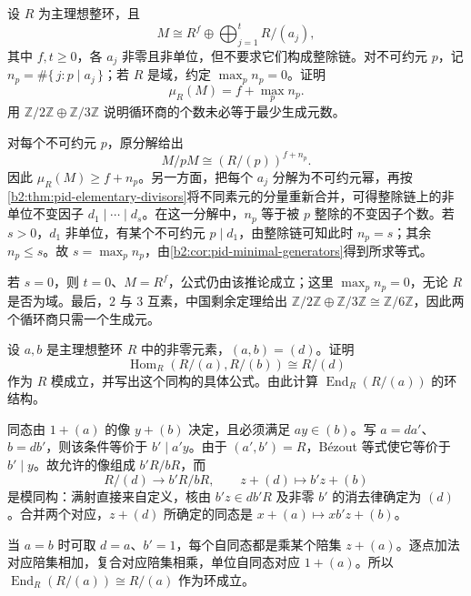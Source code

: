 \begin{exercise}\label{b2:ex:04-minimal-generators}
	设 \(R\) 为主理想整环，且
	\[
		M\cong R^f\oplus\bigoplus_{j=1}^t R/(a_j),
	\]
	其中 \(f,t\ge0\)，各 \(a_j\) 非零且非单位，但不要求它们构成整除链。对不可约元 \(p\)，记 \(n_p=\#\{\,j:p\mid a_j\,\}\)；若 \(R\) 是域，约定 \(\max_p n_p=0\)。证明
	\[
		\mu_R(M)=f+\max_p n_p.
	\]
	用 \(\mathbb Z/2\mathbb Z\oplus\mathbb Z/3\mathbb Z\) 说明循环商的个数未必等于最少生成元数。
\end{exercise}
\begin{solution}
	对每个不可约元 \(p\)，原分解给出
	\[
		M/pM\cong(R/(p))^{f+n_p}.
	\]
	因此 \(\mu_R(M)\ge f+n_p\)。另一方面，把每个 \(a_j\) 分解为不可约元幂，再按\cref{b2:thm:pid-elementary-divisors}将不同素元的分量重新合并，可得整除链上的非单位不变因子 \(d_1\mid\cdots\mid d_s\)。在这一分解中，\(n_p\) 等于被 \(p\) 整除的不变因子个数。若 \(s>0\)，\(d_1\) 非单位，有某个不可约元 \(p\mid d_1\)，由整除链可知此时 \(n_p=s\)；其余 \(n_p\le s\)。故 \(s=\max_p n_p\)，由\cref{b2:cor:pid-minimal-generators}得到所求等式。

	若 \(s=0\)，则 \(t=0\)、\(M=R^f\)，公式仍由该推论成立；这里 \(\max_p n_p=0\)，无论 \(R\) 是否为域。最后，\(2\) 与 \(3\) 互素，中国剩余定理给出 \(\mathbb Z/2\mathbb Z\oplus\mathbb Z/3\mathbb Z\cong\mathbb Z/6\mathbb Z\)，因此两个循环商只需一个生成元。
\end{solution}

\begin{exercise}\label{b2:ex:04-hom-cyclic-pid}
	设 \(a,b\) 是主理想整环 \(R\) 中的非零元素，\((a,b)=(d)\)。证明
	\[
		\operatorname{Hom}_R(R/(a),R/(b))\cong R/(d)
	\]
	作为 \(R\) 模成立，并写出这个同构的具体公式。由此计算 \(\operatorname{End}_R(R/(a))\) 的环结构。
\end{exercise}
\begin{solution}
	同态由 \(1+(a)\) 的像 \(y+(b)\) 决定，且必须满足 \(ay\in(b)\)。写 \(a=da'\)、\(b=db'\)，则该条件等价于 \(b'\mid a'y\)。由于 \((a',b')=R\)，Bézout 等式使它等价于 \(b'\mid y\)。故允许的像组成 \(b'R/bR\)，而
	\[
		R/(d)\longrightarrow b'R/bR,\qquad z+(d)\longmapsto b'z+(b)
	\]
	是模同构：满射直接来自定义，核由 \(b'z\in db'R\) 及非零 \(b'\) 的消去律确定为 \((d)\)。合并两个对应，\(z+(d)\) 所确定的同态是 \(x+(a)\mapsto xb'z+(b)\)。

	当 \(a=b\) 时可取 \(d=a\)、\(b'=1\)，每个自同态都是乘某个陪集 \(z+(a)\)。逐点加法对应陪集相加，复合对应陪集相乘，单位自同态对应 \(1+(a)\)。所以 \(\operatorname{End}_R(R/(a))\cong R/(a)\) 作为环成立。
\end{solution}

